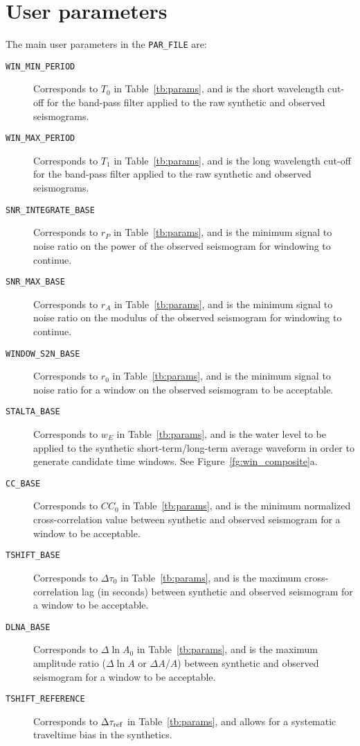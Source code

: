 \section{User parameters}
The main user parameters in the {\tt PAR\_FILE} are:
\begin{description}
\item[{\tt WIN\_MIN\_PERIOD}]Corresponds to $T_0$ in Table~\ref{tb:params}, and is the short wavelength cut-off for the band-pass filter applied to the raw synthetic and observed seismograms.
\item[{\tt WIN\_MAX\_PERIOD}]Corresponds to $T_1$ in Table~\ref{tb:params}, and is the long wavelength cut-off for the band-pass filter applied to the raw synthetic and observed seismograms.
\item[{\tt SNR\_INTEGRATE\_BASE}]Corresponds to $r_P$ in Table~\ref{tb:params}, and is the minimum signal to noise ratio on the power of the observed seismogram for windowing to continue.
\item[{\tt SNR\_MAX\_BASE}]Corresponds to $r_A$ in Table~\ref{tb:params}, and is the minimum signal to noise ratio on the modulus of the observed seismogram for windowing to continue.
\item[{\tt WINDOW\_S2N\_BASE}]Corresponds to $r_0$ in Table~\ref{tb:params}, and is the minimum signal to noise ratio for a window on the observed seismogram to be acceptable.
\item[{\tt STALTA\_BASE}]Corresponds to $w_E$ in Table~\ref{tb:params}, and is the water level to be applied to the synthetic short-term/long-term average waveform in order to generate candidate time windows.  See Figure~\ref{fg:win_composite}a.
\item[{\tt CC\_BASE}]Corresponds to $CC_0$ in Table~\ref{tb:params}, and is the minimum normalized cross-correlation value between synthetic and observed seismogram for a window to be acceptable.
\item[{\tt TSHIFT\_BASE}]Corresponds to $\Delta\tau_0$ in Table~\ref{tb:params}, and is the maximum cross-correlation lag (in seconds) between synthetic and observed seismogram for a window to be acceptable.
\item[{\tt DLNA\_BASE}]Corresponds to $\Delta\ln{A}_0$ in Table~\ref{tb:params}, and is the maximum amplitude ratio ($\Delta\ln{A}$ or $\Delta A/A$) between synthetic and observed seismogram for a window to be acceptable.
\item[{\tt TSHIFT\_REFERENCE}]Corresponds to $\Delta\tau_{\rm ref}$ in Table~\ref{tb:params}, and allows for a systematic traveltime bias in the synthetics.

\end{description}
